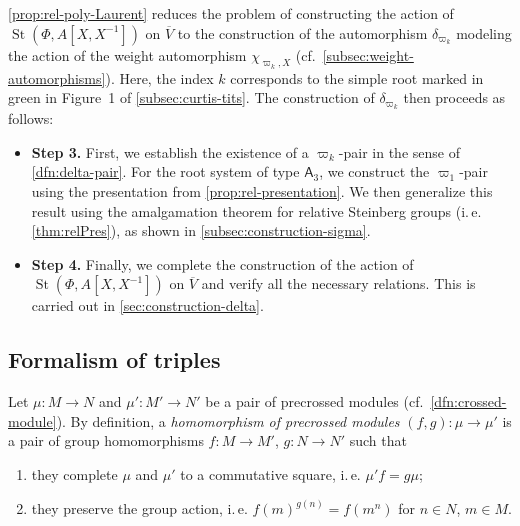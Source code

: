 \documentclass[oneside, 10pt]{amsart}
\DeclareMathOperator{\St}{St}
\newcommand{\rA}{\mathsf{A}}
\newcommand{\inv}{^{-1}}
\numberwithin{equation}{section}
\numberwithin{thm}{section}
\numberwithin{lemma}{section}
\theoremstyle{definition}
\theoremstyle{remark}
\begin{document}
\cref{prop:rel-poly-Laurent} reduces the problem of constructing the action of \( \St(\Phi, A[X, X\inv]) \) on \( \overline{V} \) to the construction of
the automorphism \( \delta_{\varpi_k} \) modeling the action of the weight automorphism \( \chi_{\varpi_k, X} \) (cf.~\cref{subsec:weight-automorphisms}).
Here, the index \( k \) corresponds to the simple root marked in green in Figure~1 of \cref{subsec:curtis-tits}.
The construction of \( \delta_{\varpi_k} \) then proceeds as follows:
\begin{itemize}
\item \textbf{Step 3.} First, we establish the existence of a \( \varpi_k \)-pair in the sense of \cref{dfn:delta-pair}.
For the root system of type \( \rA_3 \), we construct the \( \varpi_1 \)-pair using the presentation from \cref{prop:rel-presentation}.
We then generalize this result using the amalgamation theorem for relative Steinberg groups (i.\,e. \cref{thm:relPres}), as shown in \cref{subsec:construction-sigma}.
\item \textbf{Step 4.} Finally, we complete the construction of the action of \( \St(\Phi, A[X, X\inv]) \) on \( \overline{V} \) and verify all the necessary relations.
This is carried out in \cref{sec:construction-delta}.
\end{itemize}

\subsection{Formalism of triples}\label{subsec:triples}
Let $\mu\colon M \to N$ and $\mu' \colon M' \to N'$ be a pair of precrossed modules (cf.~\cref{dfn:crossed-module}).
By definition, a \textit{homomorphism of precrossed modules} $(f, g)\colon \mu \to \mu'$ is a pair of group homomorphisms $f\colon M \to M'$, $g\colon N \to N'$ such that
\begin{enumerate}[ref=CH\arabic*, label=CH\arabic*)]
\item \label{ax:ch-cs} they complete $\mu$ and $\mu'$ to a commutative square, i.\,e. $\mu'f = g \mu$;
\item \label{ax:ch-ga} they preserve the group action, i.\,e. ${f(m)}^{g(n)} = f(m^n)$ for $n \in N$, $m \in M$.
\end{enumerate}
\end{document}
